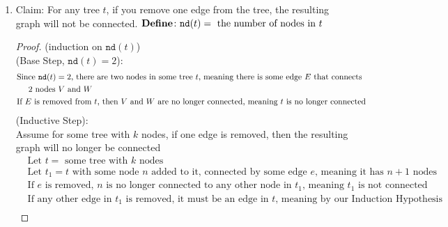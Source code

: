 \documentclass{article}
\begin{document}
\begin{enumerate}
\begin{proof}
\begin{align}
            &\hspace{2.5cm} \text{assumption that every pair of vertices has one and only one path between them} \\
            &\hspace{1cm} \text{Under the assumption that } G \text{ is not a tree, we proved an impossibility of there being} \\
            &\hspace{1.5cm} 2 \text{ distinct paths from one vertex to another, so } G \text{ must be a tree}
        \end{align}
    \end{proof}
    \item Claim: For any tree $t$, if you remove one edge from the tree, the resulting graph will not be connected.
    $\bold{Define} \colon \texttt{nd}(t) = \text{ the number of nodes in } t$
    \begin{proof}
        (induction on $\texttt{nd}(t)$) \\
        (Base Step, $\texttt{nd}(t) = 2$):
        \begin{align}
            &\text{Since } \texttt{nd}(t) = 2 \text{, there are two nodes in some tree } t \text{, meaning there is some edge } E \text{ that connects} \\
            &\hspace{0.5cm} \text{2 nodes } V \text{ and } W \\
            &\text{If } E \text{ is removed from } t \text{, then } V \text{ and } W \text{ are no longer connected, meaning } t \text{ is no longer connected}
        \end{align}
        (Inductive Step): \\
        Assume for some tree with $k$ nodes, if one edge is removed, then the resulting graph will no longer be connected
        \begin{align}
            &\text{Let } t = \text{ some tree with } k \text{ nodes} \\
            &\text{Let } t_1 = t \text{ with some node } n \text{ added to it, connected by some edge } e \text{, meaning it has } n+1 \text{ nodes} \\
            &\text{If } e \text{ is removed, } n \text{ is no longer connected to any other node in } t_1 \text{, meaning } t_1 \text{ is not connected} \\
            &\text{If any other edge in } t_1 \text{ is removed, it must be an edge in } t \text{, meaning by our Induction Hypothesis} \\

\end{align}
\end{proof}
\end{enumerate}
\end{document}
